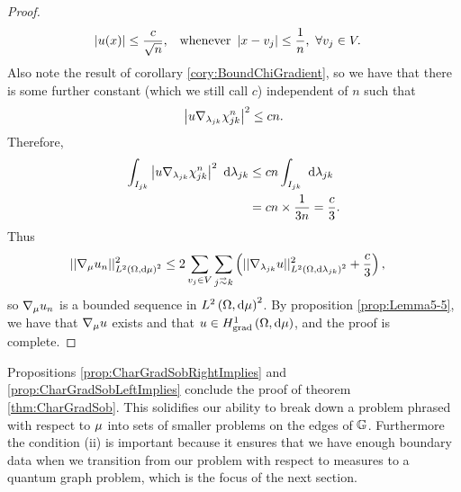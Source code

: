 \begin{proof}
\begin{align*}
		\left\lvert  u(x)  \right\rvert \leq \frac{c}{\sqrt{n}}, &\quad\text{whenever } \left\lvert x-v_j \right\rvert\leq\frac{1}{n}, \ \forall v_j\in V.
	\end{align*}
	Also note the result of corollary \ref{cory:BoundChiGradient}, so we have that there is some further constant (which we still call $c$) independent of $n$ such that
	\begin{align*}
		\left\lvert u\nabla_{\lambda_{jk}}\chi_{jk}^n \right\rvert^2 \leq cn.
	\end{align*}
	Therefore,
	\begin{align*}
		\int_{I_{jk}}\left\lvert  u\nabla_{\lambda_{jk}}\chi_{jk}^n  \right\rvert^2 \ \mathrm{d}\lambda_{jk}
		&\leq cn\int_{I_{jk}} \ \mathrm{d}\lambda_{jk} \\
		&= cn\times\frac{1}{3n} = \frac{c}{3} .
	\end{align*}
	Thus
	\begin{align*}
		\norm{\grad_{\ddmes}u_n}_{\ltwo{\ddom}{\ddmes}^2}^2
		&\leq 2\sum_{v_j\in V}\sum_{j\conLeft k}\bracs{ \norm{\grad_{\lambda_{jk}}u}_{\ltwo{\ddom}{\lambda_{jk}}^2}^2 + \frac{c}{3}},
	\end{align*}
	so $\nabla_{\mu}u_n$ is a bounded sequence in $L^{2}\left( \Omega,\mathrm{d}\mu \right)^2$.
	By proposition \ref{prop:Lemma5-5}, we have that $\nabla_\mu u$ exists and that
	$u\in H^1_\mathrm{grad}\left( \Omega, \mathrm{d}\mu \right)$, and the proof is complete.
\end{proof}

Propositions \ref{prop:CharGradSobRightImplies} and \ref{prop:CharGradSobLeftImplies}  conclude the proof of theorem \ref{thm:CharGradSob}.
This solidifies our ability to break down a problem phrased with respect to $\mu$ into sets of smaller problems on the edges of $\mathbb{G}$.
Furthermore the condition (ii) is important because it ensures that we have enough boundary data when we transition from our problem with respect to measures to a quantum graph problem, which is the focus of the next section.

